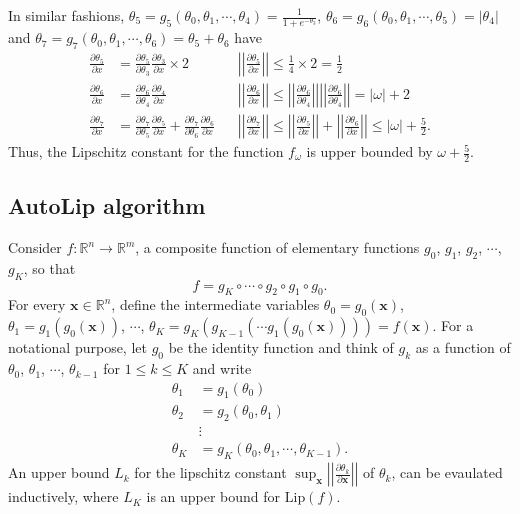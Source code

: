 \documentclass[12pt]{report}
\numberwithin{figure}{chapter}
\theoremstyle{plain}
\theoremstyle{definition}
\theoremstyle{corollary}
\theoremstyle{definition}
\theoremstyle{plain}
\theoremstyle{definition}
\theoremstyle{plain}
\newcommand\lip{\ensuremath{\text{Lip}}}
\newcommand\pa[2]{\ensuremath{\frac{\partial #1}{\partial #2}}}
\newcommand\norm[1]{\ensuremath{\left|\left|#1\right|\right|}}
\begin{document}
In similar fashions,
\(\theta_5=g_5(\theta_0,\theta_1,\cdots,\theta_4)=\frac1{1+e^{-\theta_3}}\),
\(\theta_6=g_6(\theta_0,\theta_1,\cdots,\theta_5)=|\theta_4|\) and
\(\theta_7=g_7(\theta_0,\theta_1,\cdots,\theta_6)=\theta_5+\theta_6\) have
\begin{align*}
\pa{\theta_5}x&=\pa{\theta_5}{\theta_3}\pa{\theta_3}x\times 2&&\norm{\pa{\theta_5}x}\le\frac14\times2=\frac12\\
\pa{\theta_6}x&=\pa{\theta_6}{\theta_4}\pa{\theta_4}x&&\norm{\pa{\theta_6}x}
\le\norm{\pa{\theta_6}{\theta_4}}\norm{\pa{\theta_6}{\theta_4}}=|\omega|+2\\
\pa{\theta_7}x&=\pa{\theta_7}{\theta_5}\pa{\theta_5}x+\pa{\theta_7}{\theta_6}\pa{\theta_6}x&&\norm{\pa{\theta_7}x}
\le\norm{\pa{\theta_5}x}+\norm{\pa{\theta_6}x}\le|\omega|+\frac52.
\end{align*}
Thus, the Lipschitz constant for the function \(f_\omega\) is upper bounded by \(\omega+\frac52\).

\subsection{AutoLip algorithm}
Consider \(f:\mathbb R^n\to\mathbb R^m\), a composite function of elementary functions \(g_0\), \(g_1\), \(g_2\), \(\cdots\), \(g_K\), so that
\[f={g_K}\circ\cdots\circ{g_2}\circ{g_1}\circ{g_0}.\]
For every \(\boldsymbol x\in\mathbb R^n\), define the intermediate variables
\(\theta_0=g_0(\boldsymbol x)\), \(\theta_1=g_1(g_0(\boldsymbol x))\), \(\cdots\), \(\theta_K=g_K(g_{K-1}(\cdots g_1(g_0(\boldsymbol x))))=f(\boldsymbol x)\).
For a notational purpose, let \(g_0\) be the identity function and think of \(g_k\) as a function of \(\theta_0\), \(\theta_1\), \(\cdots\), \(\theta_{k-1}\) for \(1\le k\le K\) and write
\begin{align*}
\theta_1&=g_1(\theta_0)\\
\theta_2&=g_2(\theta_0,\theta_1)\\
&\vdots\\
\theta_K&=g_K(\theta_0,\theta_1,\cdots,\theta_{K-1}).
\end{align*}
An upper bound \(L_k\) for the lipschitz constant \(\sup_{\boldsymbol x}\left|\left|\frac{\partial\theta_k}{\partial\boldsymbol x}\right|\right|\) of \(\theta_k\), can be evaulated inductively, where \(L_K\) is an upper bound for \(\lip(f)\).
\end{document}
